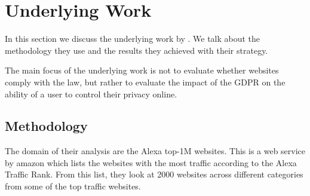 \section{Underlying Work}
\label{sec:underlying}

In this section we discuss the underlying work by . We talk about the methodology they use and the
results they achieved with their strategy.

The main focus of the underlying work is not to evaluate whether websites comply with the law, but rather to evaluate
the impact of the GDPR on the ability of a user to control their privacy online.

\subsection{Methodology}

The domain of their analysis are the Alexa top-1M websites. This is a web service by amazon which lists the websites with
the most traffic according to the Alexa Traffic Rank. From this list, they look at 2000 websites across different
categories from some of the top traffic websites.

